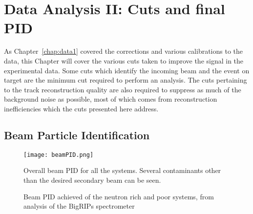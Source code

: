 \chapter{Data Analysis II: Cuts and final PID}
\label{chap:data2}

As Chapter~\ref{chap:data1} covered the corrections and various calibrations to the data, this Chapter will cover the various cuts taken to improve the signal in the experimental data. Some cuts which identify the incoming beam and the event on target are the minimum cut required to perform an analysis. The cuts pertaining to the track reconstruction quality are also required to suppress as much of the background noise as possible, most of which comes from reconstruction inefficiencies which the cuts presented here address. 



\section{Beam Particle Identification}
\label{sec:beam}

\begin{figure}[!htb]
\centering
\texttt{[image: beamPID.png]}
\caption{Overall beam PID for all the systems. Several contaminants other than the desired secondary beam can be seen.}
\label{fig:beampid}
\end{figure}


\begin{figure}[!htb]%
    \centering
    \qquad

	\caption{Beam PID achieved of the neutron rich and poor systems, from analysis of the BigRIPs spectrometer \cite{jon} }
	\label{fig:beampidTwo}
\end{figure}


